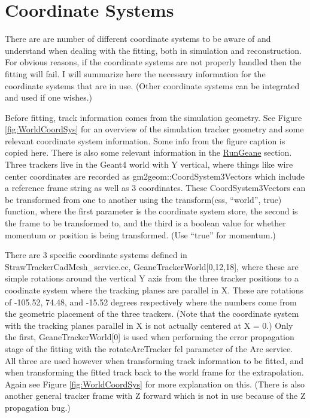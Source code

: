 \section{Coordinate Systems}
\label{sec:Coord}

	There are are number of different coordinate systems to be aware of and understand when dealing with the fitting, both in simulation and reconstruction. For obvious reasons, if the coordinate systems are not properly handled then the fitting will fail. I will summarize here the necessary information for the coordinate systems that are in use. (Other coordinate systems can be integrated and used if one wishes.)

	Before fitting, track information comes from the simulation geometry. See Figure \ref{fig:WorldCoordSys} for an overview of the simulation tracker geometry and some relevant coordinate system information. Some info from the figure caption is copied here. There is also some relevant information in the \hyperref[sec:RunGeane]{RunGeane} section. Three trackers live in the Geant4 world with Y vertical, where things like wire center coordinates are recorded as gm2geom::CoordSystem3Vectors which include a reference frame string as well as 3 coordinates. These CoordSystem3Vectors can be transformed from one to another using the transform(css, ``world'', true) function, where the first parameter is the coordinate system store, the second is the frame to be transformed to, and the third is a boolean value for whether momentum or position is being transformed. (Use ``true'' for momentum.)

	There are 3 specific coordinate systems defined in StrawTrackerCadMesh\_service.cc, GeaneTrackerWorld[0,12,18], where these are simple rotations around the vertical Y axis from the three tracker positions to a coodinate system where the tracking planes are parallel in X. These are rotations of -105.52, 74.48, and -15.52 degrees respectively where the numbers come from the geometric placement of the three trackers. (Note that the coordinate system with the tracking planes parallel in X is not actually centered at X = 0.) Only the first, GeaneTrackerWorld[0] is used when performing the error propagation stage of the fitting with the rotateArcTracker fcl parameter of the Arc service. All three are used however when transforming track information to be fitted, and when transforming the fitted track back to the world frame for the extrapolation. Again see Figure \ref{fig:WorldCoordSys} for more explanation on this. (There is also another general tracker frame with Z forward which is not in use because of the Z propagation bug.) 

